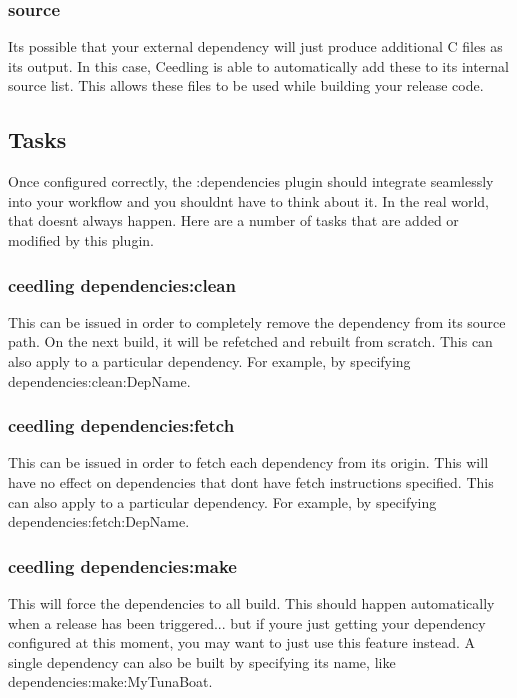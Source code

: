 \subsubsection*{{\ttfamily source}}

It\textquotesingle{}s possible that your external dependency will just produce additional C files as its output. In this case, Ceedling is able to automatically add these to its internal source list. This allows these files to be used while building your release code.

\subsection*{Tasks }

Once configured correctly, the {\ttfamily \+:dependencies} plugin should integrate seamlessly into your workflow and you shouldn\textquotesingle{}t have to think about it. In the real world, that doesn\textquotesingle{}t always happen. Here are a number of tasks that are added or modified by this plugin.

\subsubsection*{{\ttfamily ceedling dependencies\+:clean}}

This can be issued in order to completely remove the dependency from its source path. On the next build, it will be refetched and rebuilt from scratch. This can also apply to a particular dependency. For example, by specifying {\ttfamily dependencies\+:clean\+:Dep\+Name}.

\subsubsection*{{\ttfamily ceedling dependencies\+:fetch}}

This can be issued in order to fetch each dependency from its origin. This will have no effect on dependencies that don\textquotesingle{}t have fetch instructions specified. This can also apply to a particular dependency. For example, by specifying {\ttfamily dependencies\+:fetch\+:Dep\+Name}.

\subsubsection*{{\ttfamily ceedling dependencies\+:make}}

This will force the dependencies to all build. This should happen automatically when a release has been triggered... but if you\textquotesingle{}re just getting your dependency configured at this moment, you may want to just use this feature instead. A single dependency can also be built by specifying its name, like {\ttfamily dependencies\+:make\+:My\+Tuna\+Boat}.

